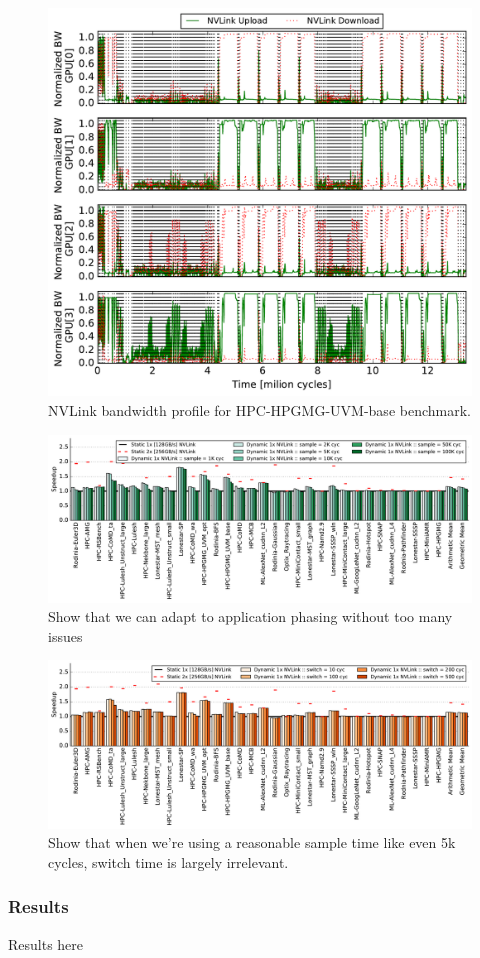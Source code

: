 \begin{figure}[t]
    \centering
    \includegraphics[width=1.0\columnwidth]{figures/bw_profile_HPGMG_UVM_base.pdf}
    \caption{NVLink bandwidth profile for HPC-HPGMG-UVM-base benchmark. }
    \label{fig:link-motivation}
\end{figure}

\begin{figure}[tp]
    \centering
    \includegraphics[width=1.0\textwidth]{figures/plot_nvlink_sample_time.pdf}
    \caption{Show that we can adapt to application phasing without too many 
issues}
    \label{fig:sampletime}
\end{figure}


\begin{figure}[tp]
    \centering
    \includegraphics[width=1.0\textwidth]{figures/plot_nvlink_switch_time_sample_time5000.pdf}
    \caption{Show that when we're using a reasonable sample time like even 5k 
cycles, switch time is largely irrelevant.}
    \label{fig:switchtime}
\end{figure}

\subsubsection{Results}
Results here
